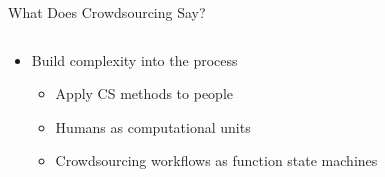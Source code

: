 \documentclass[presentation]{subfiles}
\begin{document}
\begin{frame}{What Does Crowdsourcing Say?}
\begin{columns}
  \begin{column}{0.6\textwidth}
    \begin{itemize}
      \item Build complexity into the process
      \begin{itemize}
        \item<1> Apply CS methods to people\\
        \scriptsize{
          \textcite{crowdForgeKittur}
        }
        \item<2> Humans as computational units\\
        \scriptsize{
          \textcite{Lasecki:2014:LSR:2661334.2661352}
        }
        \item<3> Crowdsourcing workflows as function state machines\\
        \scriptsize{\textcite{latoza2014microtask}
        }
      \end{itemize}
    \end{itemize}
  \end{column}
  
  \begin{column}{0.4\textwidth}
    \begin{figure}
    

\end{figure}
\end{column}
\end{columns}
\end{frame}
\end{document}
